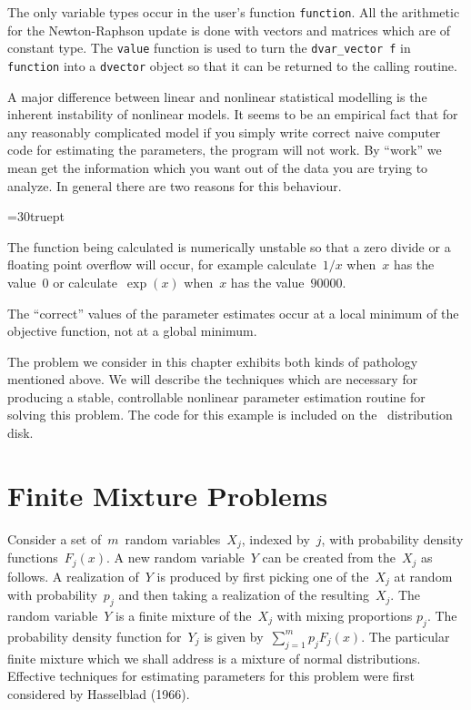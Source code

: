 \documentclass[12pt]{book}
\begin{document}
The only variable types occur in the
user's function {\tt function}. All the arithmetic for the
Newton-Raphson update is done with vectors and matrices which
are of constant type.  The {\tt value} function is used to
turn the {\tt dvar\_vector f} in {\tt function} into
a {\tt dvector} object so that it can be returned to the
calling routine. 

\endchapter


\htmlnewfile 
\def\bs{char92}
A major difference between linear and nonlinear statistical
modelling is the inherent instability of nonlinear models.
It seems to be an empirical fact that for any
reasonably complicated model if you simply write correct
naive computer code for estimating the parameters, the
program will not work. By ``work'' we mean get the information
which you want out of the data you are trying to analyze. 
In general there are two reasons for this behaviour.
{\parindent=30truept
\begin{description}
 The function being calculated is numerically unstable so
that a zero divide or a floating point overflow
 will occur, for example calculate~$1/x$ 
when~$x$ has the value~$0$ or calculate~$\exp(x)$ when~$x$ 
has the value~$90000$.

 The ``correct'' values of the parameter estimates occur at a local
minimum of the objective function, not at a global minimum.
\end{description}
\par }

The problem we consider in this chapter exhibits both kinds of pathology
mentioned above.  We will describe the techniques which are necessary for
producing a stable, controllable nonlinear parameter estimation
routine for solving this problem. The code for this example is 
included on the \AD\ distribution disk.

\section{Finite Mixture Problems}
Consider a set of~$m$~random variables~$X_j$, indexed by~$j$,
with probability density functions~$F_j(x)$.
A new random variable~$Y$ can be created from the~$X_j$  as
follows. A realization of~$Y$ is produced by first picking
one of the~$X_j$ at random with probability~$p_j$ and then
taking a realization of the resulting~$X_j$. The random
variable~$Y$ is a finite mixture of the~$X_j$ with
mixing proportions $p_j$. The probability density function
for~$Y_j$ is given by~$\sum_{j=1}^m p_jF_j(x)$. 
The particular finite mixture which we shall address is
a mixture of normal distributions. Effective techniques for
estimating parameters for this problem were first considered by
Hasselblad (1966).
\end{document}
